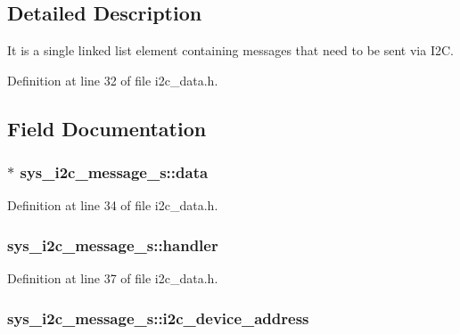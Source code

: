 \subsection{Detailed Description}
It is a single linked list element containing messages that need to be sent via I2\+C. 

Definition at line 32 of file i2c\+\_\+data.\+h.



\subsection{Field Documentation}
\hypertarget{structsys__i2c__message__s_a49fa3d575b300fed2ea06cf331fa2180}{}
\subsubsection[{data}]{$\ast$ sys\+\_\+i2c\+\_\+message\+\_\+s\+::data}\label{structsys__i2c__message__s_a49fa3d575b300fed2ea06cf331fa2180}


Definition at line 34 of file i2c\+\_\+data.\+h.

\hypertarget{structsys__i2c__message__s_a8632203d9a89893cb761ec37356c2288}{}
\subsubsection[{handler}]{ sys\+\_\+i2c\+\_\+message\+\_\+s\+::handler}\label{structsys__i2c__message__s_a8632203d9a89893cb761ec37356c2288}


Definition at line 37 of file i2c\+\_\+data.\+h.

\hypertarget{structsys__i2c__message__s_ad5b59be1fb573e7bc9b9b89da842c4aa}{}
\subsubsection[{i2c\+\_\+device\+\_\+address}]{ sys\+\_\+i2c\+\_\+message\+\_\+s\+::i2c\+\_\+device\+\_\+address}\label{structsys__i2c__message__s_ad5b59be1fb573e7bc9b9b89da842c4aa}


